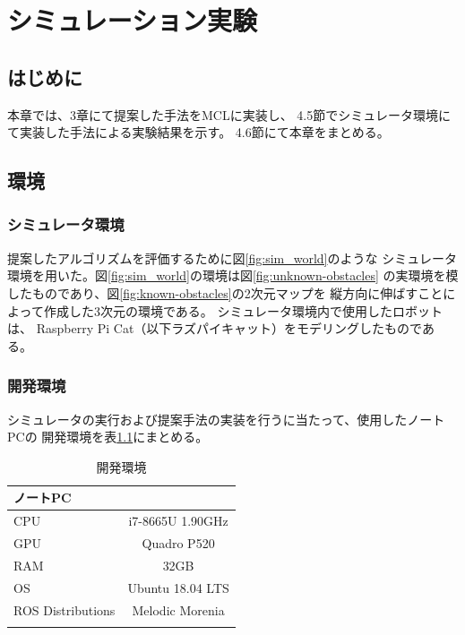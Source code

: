 \chapter{シミュレーション実験}\label{chap:simulation_experiment}

\section{はじめに}
本章では、3章にて提案した手法をMCLに実装し、
4.5節でシミュレータ環境にて実装した手法による実験結果を示す。
4.6節にて本章をまとめる。

\section{環境}

\subsection{シミュレータ環境}

提案したアルゴリズムを評価するために図\ref{fig:sim_world}のような
シミュレータ環境を用いた。図\ref{fig:sim_world}の環境は図\ref{fig:unknown-obstacles}
の実環境を模したものであり、図\ref{fig:known-obstacles}の2次元マップを
縦方向に伸ばすことによって作成した3次元の環境である。
シミュレータ環境内で使用したロボットは、
Raspberry Pi Cat（以下ラズパイキャット）をモデリングしたものである。

\subsection{開発環境}
シミュレータの実行および提案手法の実装を行うに当たって、使用したノートPCの
開発環境を表\ref{tabule:pc_spec_sim}にまとめる。

\begin{table}[ht]
  \caption{開発環境}
  \label{tabule:pc_spec_sim}
  \begin{center}
    \begin{tabular}{l|c} 
      \thline
      ノートPC& \\
      \hline
      CPU & i7-8665U 1.90GHz \\
      GPU & Quadro P520 \\
      RAM & 32GB  \\
      OS & Ubuntu 18.04 LTS \\
      ROS Distributions & Melodic Morenia \\ 
      \thline
    \end{tabular}
  \end{center}
\end{table}


